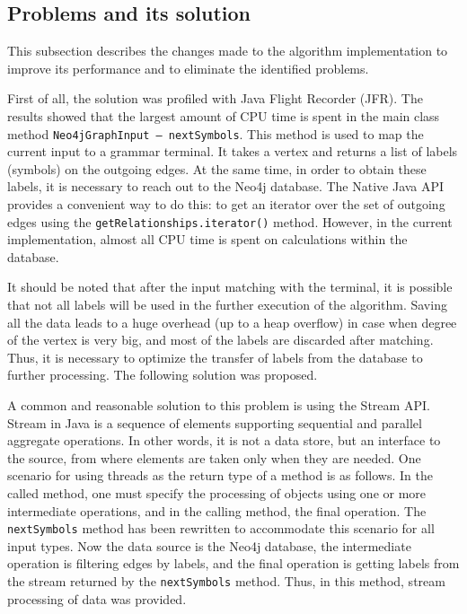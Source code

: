 \subsection{Problems and its solution}

This subsection describes the changes made to the algorithm implementation to improve its performance and to eliminate the identified problems.

First of all, the solution was profiled with Java Flight Recorder (JFR). The results showed that the largest amount of CPU time is spent in the main class method \texttt{Neo4jGraphInput --- nextSymbols}. This method is used to map the current input to a grammar terminal. It takes a vertex and returns a list of labels (symbols) on the outgoing  edges. At the same time, in order to obtain these labels, it is necessary to reach out to the Neo4j database. The Native Java API provides a convenient way to do this: to get an iterator over the set of outgoing edges using the \texttt{getRelationships.iterator()} method.
However, in the current implementation, almost all CPU time is spent on calculations within the database.

It should be noted that after the input matching with the terminal, it is possible that not all labels will be used in the further execution of the algorithm. Saving all the data leads to a huge overhead (up to a heap overflow) in case when degree of the vertex is very big, and most of the labels are discarded after matching.
Thus, it is necessary to optimize the transfer of labels from the database to further processing. The following solution was proposed.

A common and reasonable solution to this problem is using the Stream API. Stream in Java is a sequence of elements supporting sequential and parallel aggregate operations. In other words, it is not a data store, but an interface to the source, from where elements are taken only when they are needed. One scenario for using threads as the return type of a method is as follows. In the called method, one must specify the processing of objects using one or more intermediate operations, and in the calling method, the final operation. The \texttt{nextSymbols} method has been rewritten to accommodate this scenario for all input types. Now the data source is the Neo4j database, the intermediate operation is filtering edges by labels, and the final operation is getting labels from the stream returned by the \texttt{nextSymbols} method. Thus, in this method, stream processing of data was provided.

